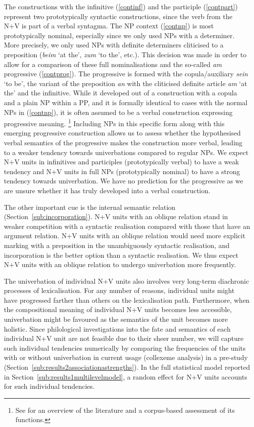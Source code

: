 \documentclass[biblatex, charis, linguex]{glossa}\usepackage{knitr}
\begin{document}
The constructions with the infinitive (\ref{continf}) and the participle (\ref{contpart}) represent two prototypically syntactic constructions, since the verb from the N+V is part of a verbal syntagma.
The NP context (\ref{contnp}) is most prototypically nominal, especially since we only used NPs with a determiner.
More precisely, we only used NPs with definite determiners cliticised to a preposition (\textit{beim} `at the', \textit{zum} `to the', etc.).
This decision was made in order to allow for a comparison of these full nominalisations and the so-called \textit{am} progressive (\ref{contprog}).
The progressive is formed with the copula\slash auxiliary \textit{sein} `to be', the variant of the preposition \textit{an} with the cliticised definite article \textit{am} `at the' and the infinitive.
While it developed out of a construction with a copula and a plain NP within a PP, and it is formally identical to cases with the normal NPs in (\ref{contnp}), it is often assumed to be a verbal construction expressing progressive meaning.%
\footnote{See \citet{AnthonissenEa2016} for an overview of the literature and a corpus-based assessment of its functions.}
Including NPs in this specific form along with this emerging progressive construction allows us to assess whether the hypothesised verbal semantics of the progressive makes the construction more verbal, leading to a weaker tendency towards univerbations compared to regular NPs.
We expect N+V units in infinitives and participles (prototypically verbal) to have a weak tendency and N+V units in full NPs (prototypically nominal) to have a strong tendency towards univerbation.
We have no prediction for the progressive as we are unsure whether it has truly developed into a verbal construction.

The other important cue is the internal semantic relation (Section~\ref{sub:incorporation}).
N+V units with an oblique relation stand in weaker competition with a syntactic realisation compared with those that have an argument relation.
N+V units with an oblique relation would need more explicit marking with a preposition in the unambiguously syntactic realisation, and incorporation is the better option than a syntactic realisation.
We thus expect N+V units with an oblique relation to undergo univerbation more frequently.

The univerbation of individual N+V units also involves very long-term diachronic processes of lexicalisation.
For any number of reasons, individual units might have progressed farther than others on the lexicalisation path.
Furthermore, when the compositional meaning of individual N+V units becomes less accessible, univerbation might be favoured as the semantics of the unit becomes more holistic.
Since philological investigations into the fate and semantics of each individual N+V unit are not feasible due to their sheer number, we will capture such individual tendencies numerically by comparing the frequencies of the units with or without univerbation in current usage (collexeme analysis) in a pre-study (Section~\ref{sub:results2associationastrengths}).
In the full statistical model reported in Section~\ref{sub:results1multilevelmodel}, a random effect for N+V units accounts for such individual tendencies.
\end{document}
